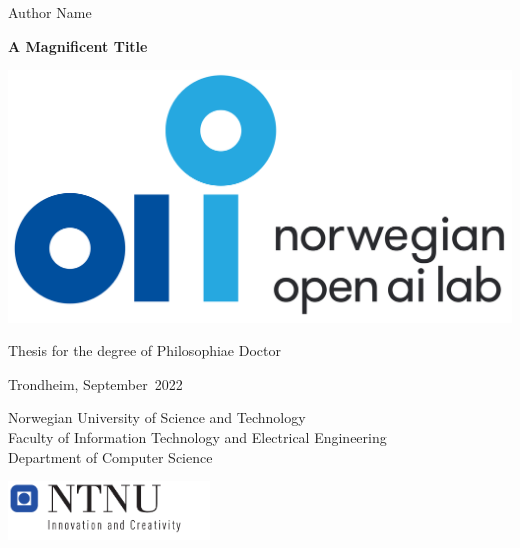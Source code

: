 \frontmatter
{
\sffamily
\parindent=0cm
\renewcommand{\headrulewidth}{0pt}
\addtolength{\parskip}{\baselineskip}
{\huge {Author Name}}
\vspace{2cm}

{\textbf {\fontsize{27}{32}\selectfont A Magnificent Title}}

{\LARGE }
\vspace{3.5cm}

{\includegraphics[scale=0.2]{images/NAIL.png}}

{\Large Thesis for the degree of Philosophiae Doctor

Trondheim, September\ 2022

Norwegian University of Science and Technology \\[0.6ex]
Faculty of Information Technology and Electrical Engineering \\[0.6ex]
Department of Computer Science}
\vfill

\includegraphics[width=0.4\textwidth]{images/NTNUlogo.pdf}

\newpage
}